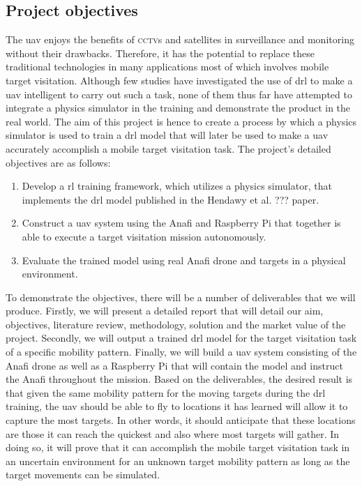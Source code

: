 \documentclass[../main.tex]{subfiles}
\begin{document}

\subsection{Project objectives}

The \gls{uav} enjoys the benefits of \textsc{cctv}s and satellites
in surveillance and monitoring without their drawbacks.
Therefore, it has the potential to replace these
traditional technologies in many applications 
most of which involves mobile target visitation. 
Although few studies have investigated the use of \gls{drl}
to make a \gls{uav} intelligent to carry out such a task,
none of them thus far have attempted to
integrate a physics simulator in the training
and demonstrate the product in the real world.
The aim of this project is hence to create a process 
by which a physics simulator is used to train 
a \gls{drl} model that will later be used
to make a \gls{uav} accurately accomplish a
mobile target visitation task.
The project's detailed objectives are as follows:

\begin{enumerate}
    \item Develop a \gls{rl} training framework,
        which utilizes a physics simulator, 
        that implements the \gls{drl} model 
        published in the Hendawy et al. ??? paper.
    \item Construct a \gls{uav} system using the Anafi and 
        Raspberry Pi that together is able to execute
        a target visitation mission autonomously.
    \item Evaluate the trained model using real Anafi drone
        and targets in a physical environment.
\end{enumerate}

To demonstrate the objectives, there will be a number 
of deliverables that we will produce.
Firstly, we will present a detailed report that will detail
our aim, objectives, literature review, methodology,
solution and the market value of the project.
Secondly, we will output a trained \gls{drl} model for 
the target visitation task of a specific
mobility pattern.
Finally, we will build a \gls{uav} system
consisting of the Anafi drone as well as a Raspberry Pi
that will contain the model and instruct
the Anafi throughout the mission.
Based on the deliverables, the desired result is that
given the same mobility pattern for 
the moving targets during the \gls{drl} training,
the \gls{uav} should be able to fly to locations it has learned
will allow it to capture the most targets. In other words,
it should anticipate that these locations are those it can reach
the quickest and also where most targets will gather.
In doing so, it will prove that it can accomplish 
the mobile target visitation task in an uncertain environment
for an unknown target mobility pattern
as long as the target movements can be simulated.
\end{document}
